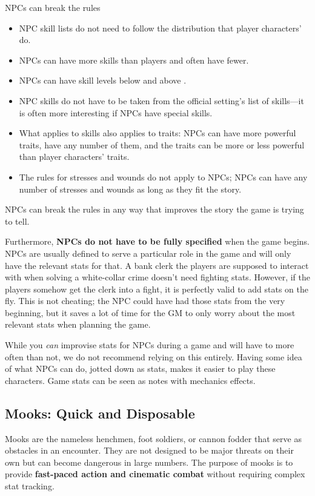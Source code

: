 \begin{Example}{NPCs can break the rules}
	\begin{itemize}
		\item NPC skill lists do not need to follow the distribution that player characters' do.
		\item NPCs can have more skills than players and often have fewer.
		\item NPCs can have skill levels below \Untrained and above \Expert.
		\item NPC skills do not have to be taken from the official setting's list of skills---it is often more interesting if NPCs have special skills.
		\item What applies to skills also applies to traits: NPCs can have more powerful traits, have any number of them, and the traits can be more or less powerful than player characters' traits.
		\item The rules for stresses and wounds do not apply to NPCs; NPCs can have any number of stresses and wounds as long as they fit the story.
	\end{itemize}
\end{Example}

NPCs can break the rules in any way that improves the story the game is trying to tell.

Furthermore, \textbf{NPCs do not have to be fully specified} when the game begins. NPCs are usually defined to serve a particular role in the game and will only have the relevant stats for that. A bank clerk the players are supposed to interact with when solving a white-collar crime doesn't need fighting stats. However, if the players somehow get the clerk into a fight, it is perfectly valid to add stats on the fly. This is not cheating; the NPC could have had those stats from the very beginning, but it saves a lot of time for the GM to only worry about the most relevant stats when planning the game.

\begin{GmTips}
	While you \emph{can} improvise stats for NPCs during a game and will have to more often than not, we do not recommend relying on this entirely. Having some idea of what NPCs can do, jotted down as stats, makes it easier to play these characters.	 Game stats can be seen as notes with mechanics effects.
\end{GmTips}


\subsection{Mooks: Quick and Disposable}
Mooks are the nameless henchmen, foot soldiers, or cannon fodder that serve as obstacles in an encounter. They are not designed to be major threats on their own but can become dangerous in large numbers. The purpose of mooks is to provide \textbf{fast-paced action and cinematic combat} without requiring complex stat tracking.

